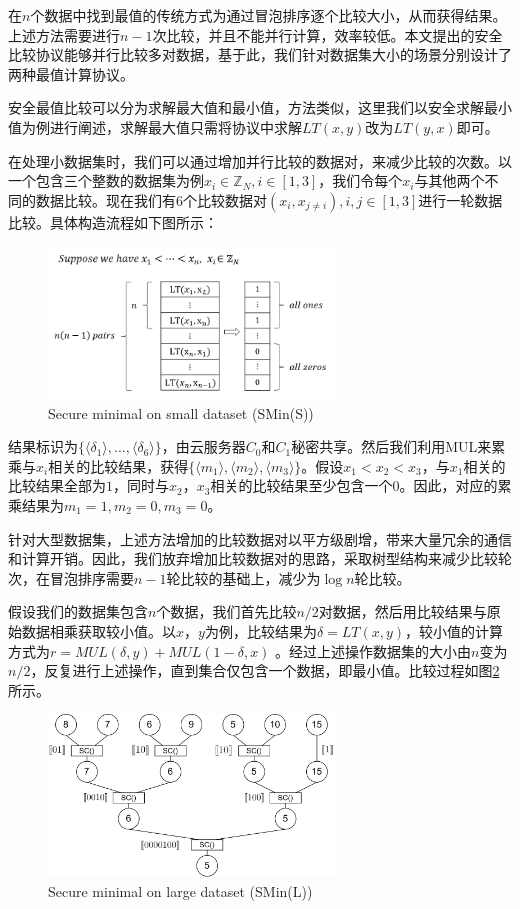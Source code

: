 在$n$个数据中找到最值的传统方式为通过冒泡排序逐个比较大小，从而获得结果。上述方法需要进行$n-1$次比较，并且不能并行计算，效率较低。本文提出的安全比较协议能够并行比较多对数据，基于此，我们针对数据集大小的场景分别设计了两种最值计算协议。

安全最值比较可以分为求解最大值和最小值，方法类似，这里我们以安全求解最小值为例进行阐述，求解最大值只需将协议中求解$LT(x,y)$改为$LT(y,x)$即可。

在处理小数据集时，我们可以通过增加并行比较的数据对，来减少比较的次数。以一个包含三个整数的数据集为例$x_i \in \mathbb{Z}_N, i\in[1,3]$，我们令每个$x_i$与其他两个不同的数据比较。现在我们有6个比较数据对$(x_i, x_{j\neq i}), i,j \in [1,3] $进行一轮数据比较。具体构造流程如下图所示：

\begin{figure}[htbp]
    \centering
    \includegraphics[width=3in]{img/fig4.png}%
    \caption{Secure minimal on small dataset (SMin(S))}
    \label{smins}
\end{figure}

结果标识为$\{\langle\delta_1\rangle,...,\langle\delta_6\rangle\}$，由云服务器$C_0$和$C_1$秘密共享。然后我们利用MUL来累乘与$x_i$相关的比较结果，获得$\{\langle m_1 \rangle,\langle m_2 \rangle,\langle m_3\rangle\}$。假设$x_1<x_2<x_3$，与$x_1$相关的比较结果全部为$1$，同时与$x_2$，$x_3$相关的比较结果至少包含一个$0$。因此，对应的累乘结果为$m_1=1, m_2=0, m_3=0$。

针对大型数据集，上述方法增加的比较数据对以平方级剧增，带来大量冗余的通信和计算开销。因此，我们放弃增加比较数据对的思路，采取树型结构来减少比较轮次，在冒泡排序需要$n-1$轮比较的基础上，减少为$\log n$轮比较。

假设我们的数据集包含$n$个数据，我们首先比较$n/2$对数据，然后用比较结果与原始数据相乘获取较小值。以$x$，$y$为例，比较结果为$\delta = LT(x,y) $，较小值的计算方式为$r=MUL(\delta, y) + MUL(1-\delta, x)$ 。经过上述操作数据集的大小由$n$变为$n/2$，反复进行上述操作，直到集合仅包含一个数据，即最小值。比较过程如图\ref{sminl}所示。

\begin{figure}[htbp]
    \centering
    \includegraphics[width=3in]{img/fig1.png}%
    \caption{Secure minimal on large dataset (SMin(L))}
    \label{sminl}
\end{figure}

